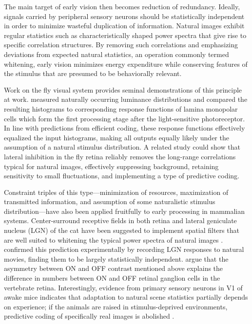 The main target of early vision then becomes reduction of redundancy. Ideally, signals carried by peripheral sensory neurons should be statistically independent in order to minimize wasteful duplication of information. Natural images exhibit regular statistics such as characteristically shaped power spectra that give rise to specific correlation structures. By removing such correlations and emphasizing deviations from expected natural statistics, an operation commonly termed whitening, early vision minimizes energy expenditure while conserving features of the stimulus that are presumed to be behaviorally relevant.

Work on the fly visual system provides seminal demonstrations of this principle at work. \citet{Laughlin:1981wn} measured naturally occurring luminance distributions and compared the resulting histograms to corresponding response functions of lamina monopolar cells which form the first processing stage after the light-sensitive photoreceptor. In line with predictions from efficient coding, these response functions effectively equalized the input histograms, making all outputs equally likely under the assumption of a natural stimulus distribution. A related study \citep{Srinivasan:1982uq} could show that lateral inhibition in the fly retina reliably removes the long-range correlations typical for natural images, effectively suppressing background, retaining sensitivity to small fluctuations, and implementing a type of predictive coding.

Constraint triples of this type---minimization of resources, maximization of transmitted information, and assumption of some naturalistic stimulus distribution---have also been applied fruitfully to early processing in mammalian systems. Center-surround receptive fields in both retina and lateral geniculate nucleus (LGN) of the cat have been suggested to implement spatial filters that are well suited to whitening the typical power spectra of natural images \citep{vanHateren:1992aa,Atick:1992aa,vanHateren:1993aa}. \citet{Dan:1996aa} confirmed this prediction experimentally by recording LGN responses to natural movies, finding them to be largely statistically independent. \citet{Ratliff:2010kb} argue that the asymmetry between ON and OFF contrast mentioned above explains the difference in numbers between ON and OFF retinal ganglion cells in the vertebrate retina. Interestingly, evidence from primary sensory neurons in V1 of awake mice indicates that adaptation to natural scene statistics partially depends on experience; if the animals are raised in stimulus-deprived environments, predictive coding of specifically real images is abolished \citep{Pecka:2014aa}.

